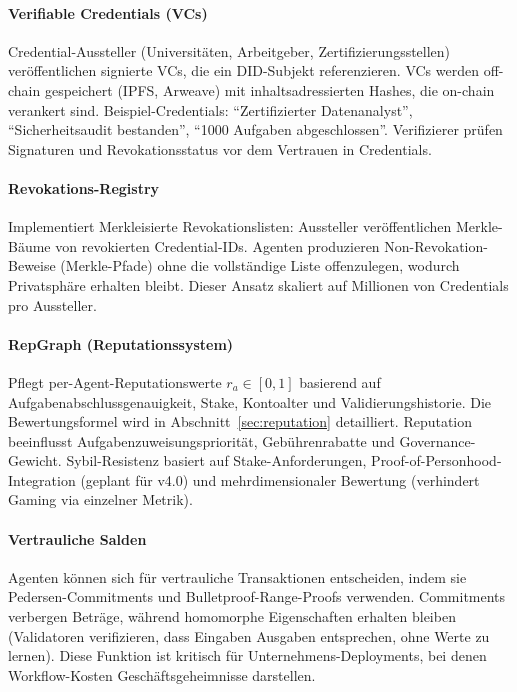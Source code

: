 \documentclass[11pt]{article}
\begin{document}
\paragraph{Verifiable Credentials (VCs)} Credential-Aussteller (Universitäten, Arbeitgeber, Zertifizierungsstellen) veröffentlichen signierte VCs, die ein DID-Subjekt referenzieren. VCs werden off-chain gespeichert (IPFS, Arweave) mit inhaltsadressierten Hashes, die on-chain verankert sind. Beispiel-Credentials: ``Zertifizierter Datenanalyst'', ``Sicherheitsaudit bestanden'', ``1000 Aufgaben abgeschlossen''. Verifizierer prüfen Signaturen und Revokationsstatus vor dem Vertrauen in Credentials.

\paragraph{Revokations-Registry} Implementiert Merkleisierte Revokationslisten: Aussteller veröffentlichen Merkle-Bäume von revokierten Credential-IDs. Agenten produzieren Non-Revokation-Beweise (Merkle-Pfade) ohne die vollständige Liste offenzulegen, wodurch Privatsphäre erhalten bleibt. Dieser Ansatz skaliert auf Millionen von Credentials pro Aussteller.

\paragraph{RepGraph (Reputationssystem)} Pflegt per-Agent-Reputationswerte $r_a \in [0,1]$ basierend auf Aufgabenabschlussgenauigkeit, Stake, Kontoalter und Validierungshistorie. Die Bewertungsformel wird in Abschnitt~\ref{sec:reputation} detailliert. Reputation beeinflusst Aufgabenzuweisungspriorität, Gebührenrabatte und Governance-Gewicht. Sybil-Resistenz basiert auf Stake-Anforderungen, Proof-of-Personhood-Integration (geplant für v4.0) und mehrdimensionaler Bewertung (verhindert Gaming via einzelner Metrik).

\paragraph{Vertrauliche Salden} Agenten können sich für vertrauliche Transaktionen entscheiden, indem sie Pedersen-Commitments und Bulletproof-Range-Proofs verwenden. Commitments verbergen Beträge, während homomorphe Eigenschaften erhalten bleiben (Validatoren verifizieren, dass Eingaben Ausgaben entsprechen, ohne Werte zu lernen). Diese Funktion ist kritisch für Unternehmens-Deployments, bei denen Workflow-Kosten Geschäftsgeheimnisse darstellen.
\end{document}
